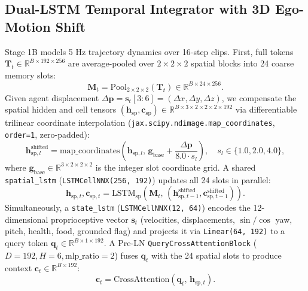 \documentclass[runningheads]{llncs}
\begin{document}
\subsection{Dual-LSTM Temporal Integrator with 3D Ego-Motion Shift}
Stage 1B models 5 Hz trajectory dynamics over 16-step clips. First, full tokens $\mathbf{T}_t \in \mathbb{R}^{B \times 192 \times 256}$ are average-pooled over $2\times2\times2$ spatial blocks into 24 coarse memory slots:
\begin{equation}
\mathbf{M}_t = \mathrm{Pool}_{2\times2\times2}(\mathbf{T}_t) \in \mathbb{R}^{B \times 24 \times 256}.
\end{equation}
Given agent displacement $\Delta\mathbf{p} = \mathbf{s}_t[3:6] = (\Delta x, \Delta y, \Delta z)$, we compensate the spatial hidden and cell tensors $(\mathbf{h}_{\text{sp}}, \mathbf{c}_{\text{sp}}) \in \mathbb{R}^{B \times 3 \times 2 \times 2 \times 2 \times 192}$ via differentiable trilinear coordinate interpolation (\texttt{jax.scipy.ndimage.map\_coordinates}, \texttt{order=1}, zero-padded):
\begin{equation}
\mathbf{h}_{\text{sp}, l}^{\text{shifted}} = \mathrm{map\_coordinates}\left(\mathbf{h}_{\text{sp}, l},\, \mathbf{g}_{\text{base}} + \frac{\Delta\mathbf{p}}{8.0 \cdot s_l}\right), \quad s_l \in \{1.0, 2.0, 4.0\},
\end{equation}
where $\mathbf{g}_{\text{base}} \in \mathbb{R}^{3 \times 2 \times 2 \times 2}$ is the integer slot coordinate grid. A shared \texttt{spatial\_lstm} (\texttt{LSTMCellNNX(256, 192)}) updates all 24 slots in parallel:
\begin{equation}
\mathbf{h}_{\text{sp}, t}, \mathbf{c}_{\text{sp}, t} = \mathrm{LSTM}_{\text{sp}}\left(\mathbf{M}_t,\, (\mathbf{h}_{\text{sp}, t-1}^{\text{shifted}}, \mathbf{c}_{\text{sp}, t-1}^{\text{shifted}})\right).
\end{equation}
Simultaneously, a \texttt{state\_lstm} (\texttt{LSTMCellNNX(12, 64)}) encodes the 12-dimensional proprioceptive vector $\mathbf{s}_t$ (velocities, displacements, $\sin/\cos$ yaw, pitch, health, food, grounded flag) and projects it via \texttt{Linear(64, 192)} to a query token $\mathbf{q}_t \in \mathbb{R}^{B \times 1 \times 192}$. A Pre-LN \texttt{QueryCrossAttentionBlock} ($D = 192, H = 6, \text{mlp\_ratio} = 2$) fuses $\mathbf{q}_t$ with the 24 spatial slots to produce context $\mathbf{c}_t \in \mathbb{R}^{B \times 192}$:
\begin{equation}
\mathbf{c}_t = \mathrm{CrossAttention}\left(\mathbf{q}_t,\, \mathbf{h}_{\text{sp}, t}\right).
\end{equation}
\end{document}
